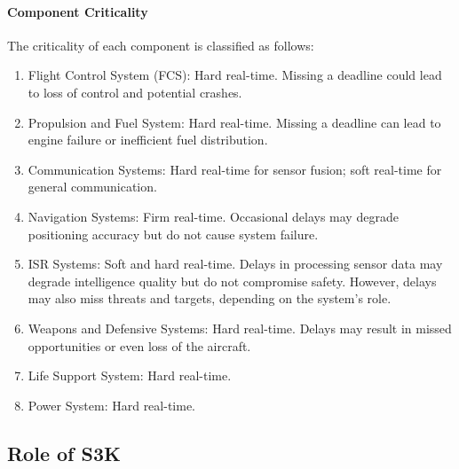 \documentclass[a4paper,11pt]{article}
\begin{document}
	\paragraph{Component Criticality}
	The criticality of each component is classified as follows:
	\begin{enumerate}[label=C\arabic*)]
		\item Flight Control System (FCS): Hard real-time. Missing a deadline could lead to loss of control and potential crashes.
		\item Propulsion and Fuel System: Hard real-time. Missing a deadline can lead to engine failure or inefficient fuel distribution.
		\item Communication Systems: Hard real-time for sensor fusion; soft real-time for general communication.
		\item Navigation Systems: Firm real-time. Occasional delays may degrade positioning accuracy but do not cause system failure.
		\item ISR Systems: Soft and hard real-time. Delays in processing sensor data may degrade intelligence quality but do not compromise safety. However, delays may also miss threats and targets, depending on the system's role.
		\item Weapons and Defensive Systems: Hard real-time. Delays may result in missed opportunities or even loss of the aircraft.
		\item Life Support System: Hard real-time.
		\item Power System: Hard real-time.
	\end{enumerate}

	\subsection*{Role of S3K}
\end{document}

